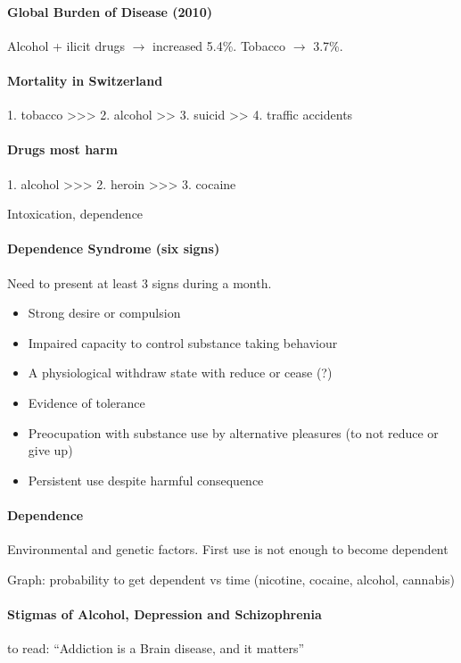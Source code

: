 \documentclass[12pt,article,oneside,a4paper]{memoir}
\begin{document}
\paragraph{Global Burden of Disease (2010)} Alcohol + ilicit drugs $\rightarrow$ increased 5.4\%. Tobacco $\rightarrow$ 3.7\%.

\paragraph{Mortality in Switzerland} 1. tobacco >>> 2. alcohol >> 3. suicid >> 4. traffic accidents

\paragraph{Drugs most harm} 1. alcohol >>> 2. heroin >>> 3. cocaine

Intoxication, dependence

\paragraph{Dependence Syndrome (six signs)} Need to present at least 3 signs during a month.
\begin{itemize}
\item Strong desire or compulsion
\item Impaired capacity to control substance taking behaviour
\item A physiological withdraw state with reduce or cease (?)
\item Evidence of tolerance
\item Preocupation with substance use by alternative pleasures (to not reduce or give up)
\item Persistent use despite harmful consequence
\end{itemize}

\paragraph{Dependence} Environmental and genetic factors. First use is not enough to become dependent

Graph: probability to get dependent vs time (nicotine, cocaine, alcohol, cannabis)

\paragraph{Stigmas of Alcohol, Depression and Schizophrenia} to read: ``Addiction is a Brain disease, and it matters''
\end{document}
